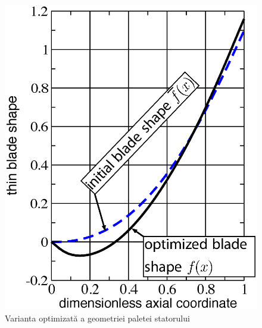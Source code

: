 \begin{figure}[h]
	\centering
	\includegraphics[scale=0.5]{figures/stator_optimized_blade.eps}
	\caption{Varianta optimizată a geometriei paletei statorului}
	\label{Varianta optimizată a geometriei paletei statorului}
\end{figure}

\clearpage